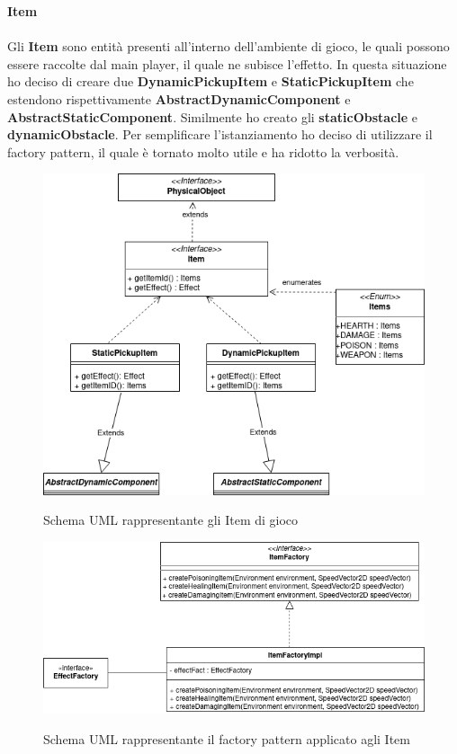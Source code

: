 \newpage

\textbf{Item} \\ \\
Gli \textbf{Item} sono entità presenti all'interno dell'ambiente di gioco, le quali possono essere raccolte dal main player, il quale ne subisce l'effetto.
In questa situazione ho deciso di creare due \textbf{DynamicPickupItem} e \textbf{StaticPickupItem} che estendono rispettivamente \textbf{AbstractDynamicComponent} e \textbf{AbstractStaticComponent}.
Similmente ho creato gli \textbf{staticObstacle} e\textbf{ dynamicObstacle}.
Per semplificare l'istanziamento ho deciso di utilizzare il factory pattern, il quale è tornato molto utile e ha ridotto la verbosità.

\begin{figure}[H]
	\centering{}
	\includegraphics[width=\textwidth]{img/item}
	\label{img:item.png}
	\caption{Schema UML rappresentante gli Item di gioco\\}
\end{figure}

\begin{figure}[H]
	\centering{}
	\includegraphics[width=\textwidth]{img/ItemFactory}
	\label{img:ItemFactory.png}
	\caption{Schema UML rappresentante il factory pattern applicato agli Item\\}
\end{figure}

